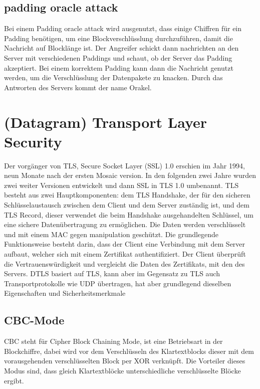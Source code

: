 \documentclass[a4paper,10pt]{scrartcl}
\begin{document}
    \subsection{padding oracle attack}\label{subsec:padding-oracle-attack}
    Bei einem Padding oracle attack wird ausgenutzt, dass einige Chiffren für ein Padding benötigen, um eine Blockverschlüsslung durchzuführen, damit die Nachricht auf Blocklänge ist.
    Der Angreifer schickt dann nachrichten an den Server mit verschiedenen Paddings und schaut, ob der Server das Padding akzeptiert.
    Bei einem korrektem Padding kann dann die Nachricht genutzt werden, um die Verschlüsslung der Datenpakete zu knacken.
    Durch das Antworten des Servers kommt der name Orakel.


    \section{(Datagram) Transport Layer Security}\label{sec:(d)tls}
    Der vorgänger von TLS, Secure Socket Layer (SSL) 1.0 erschien im Jahr 1994, neun Monate nach der ersten Mosaic version.
    In den folgenden zwei Jahre wurden zwei weiter Versionen entwickelt und dann SSL in TLS 1.0 umbenannt.
    \newline
    TLS besteht aus zwei Hauptkomponenten: dem TLS Handshake, der für den sicheren Schlüsselaustausch zwischen dem Client und dem Server zuständig ist,
    und dem TLS Record, dieser verwendet die beim Handshake ausgehandelten Schlüssel, um eine sichere Datenübertragung zu ermöglichen.
    Die Daten werden verschlüsselt und mit einem MAC gegen manipulation geschützt.
    Die grundlegende Funktionsweise besteht darin, dass der Client eine Verbindung mit dem Server aufbaut, welcher sich mit einem Zertifikat authentifiziert.
    Der Client überprüft die Vertrauenswürdigkeit und vergleicht die Daten des Zertifikats, mit den des Servers.
    \newline
    DTLS basiert auf TLS, kann aber im Gegensatz zu TLS auch Transportprotokolle wie UDP übertragen, hat aber grundlegend dieselben Eigenschaften und Sicherheitsmerkmale

    \subsection{CBC-Mode}\label{subsec:cbc-mode}
    CBC steht für Cipher Block Chaining Mode, ist eine Betriebsart in der Blockchiffre, dabei wird vor dem Verschlüsseln des Klartextblocks dieser mit dem vorausgehenden verschlüsselten Block per XOR verknüpft.
    Die Vorteiler dieses Modus sind, dass gleich Klartextblöcke unterschiedliche verschlüsselte Blöcke ergibt.
\end{document}
